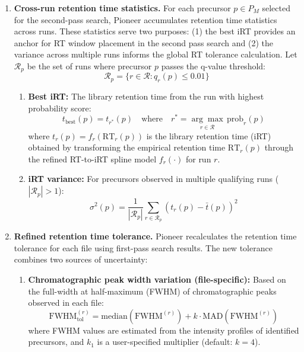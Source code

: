 \documentclass[pdflatex,sn-nature]{sn-jnl}
\begin{document}
\begin{enumerate}

\item{
\textbf{Cross-run retention time statistics.} For each precursor $p \in P_M$ selected for the second-pass search, Pioneer accumulates retention time statistics across runs. These statistics serve two purposes: (1) the best iRT provides an anchor for RT window placement in the second pass search and (2) the variance across multiple runs informs the global RT tolerance calculation. Let $\mathcal{R}_p$ be the set of runs where precursor $p$ passes the q-value threshold:
\begin{equation}
    \mathcal{R}_p = \{r \in \mathcal{R} : q_r(p) \leq 0.01\}
\end{equation}

\begin{enumerate}

\item \textbf{Best iRT:} The library retention time from the run with highest probability score:
    \begin{equation}
        t_{\text{best}}(p) = t_{r^*}(p) \quad \text{where} \quad r^* = \underset{r \in \mathcal{R}}{\arg\max} \, \text{prob}_r(p)
    \end{equation}
    where $t_r(p) = f_r(\text{RT}_r(p))$ is the library retention time (iRT) obtained by transforming the empirical retention time $\text{RT}_r(p)$ through the refined RT-to-iRT spline model $f_r(\cdot)$ for run $r$. 
\item \textbf{iRT variance:} For precursors observed in multiple qualifying runs ($|\mathcal{R}_p| > 1$):
    \begin{equation}
        \sigma^2(p) = \frac{1}{|\mathcal{R}_p|} \sum_{r \in \mathcal{R}_p} \left(t_r(p) - \bar{t}(p)\right)^2
    \end{equation}
\end{enumerate}
}

\item{
\textbf{Refined retention time tolerance.} Pioneer recalculates the retention time tolerance for each file using first-pass search results. The new tolerance combines two sources of uncertainty:

\begin{enumerate}
    \item \textbf{Chromatographic peak width variation (file-specific):} Based on the full-width at half-maximum (FWHM) of chromatographic peaks observed in each file:
    \begin{equation}
        \text{FWHM}_{\text{tol}}^{(r)} = \text{median}(\text{FWHM}^{(r)}) + k \cdot \text{MAD}(\text{FWHM}^{(r)})
    \end{equation}
    where FWHM values are estimated from the intensity profiles of identified precursors, and $k_1$ is a user-specified multiplier (default: $k=4$).


\end{enumerate}}
\end{enumerate}
\end{document}
